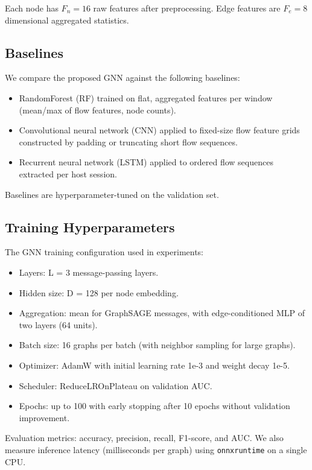 \documentclass[conference]{IEEEtran}
\begin{document}
Each node has $F_n = 16$ raw features after preprocessing. Edge features are $F_e = 8$ dimensional aggregated statistics.

\subsection{Baselines}

We compare the proposed GNN against the following baselines:

\begin{itemize}
  \item RandomForest (RF) trained on flat, aggregated features per window (mean/max of flow features, node counts).
  \item Convolutional neural network (CNN) applied to fixed-size flow feature grids constructed by padding or truncating short flow sequences.
  \item Recurrent neural network (LSTM) applied to ordered flow sequences extracted per host session.
\end{itemize}

Baselines are hyperparameter-tuned on the validation set.

\subsection{Training Hyperparameters}

The GNN training configuration used in experiments:

\begin{itemize}
  \item Layers: L = 3 message-passing layers.
  \item Hidden size: D = 128 per node embedding.
  \item Aggregation: mean for GraphSAGE messages, with edge-conditioned MLP of two layers (64 units).
  \item Batch size: 16 graphs per batch (with neighbor sampling for large graphs).
  \item Optimizer: AdamW with initial learning rate 1e-3 and weight decay 1e-5.
  \item Scheduler: ReduceLROnPlateau on validation AUC.
  \item Epochs: up to 100 with early stopping after 10 epochs without validation improvement.
\end{itemize}

Evaluation metrics: accuracy, precision, recall, F1-score, and AUC. We also measure inference latency (milliseconds per graph) using \texttt{onnxruntime} on a single CPU.
\end{document}
